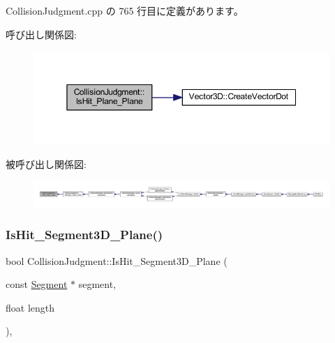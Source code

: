  Collision\+Judgment.\+cpp の 765 行目に定義があります。

呼び出し関係図\+:\nopagebreak
\begin{figure}[H]
\begin{center}
\leavevmode
\includegraphics[width=350pt]{class_collision_judgment_a549042895226422e8551afff35519a59_cgraph}
\end{center}
\end{figure}
被呼び出し関係図\+:
\nopagebreak
\begin{figure}[H]
\begin{center}
\leavevmode
\includegraphics[width=350pt]{class_collision_judgment_a549042895226422e8551afff35519a59_icgraph}
\end{center}
\end{figure}
\mbox{\label{class_collision_judgment_a0f5514dbfaa4dde5531cb6e5512502e5}} 
\subsubsection{\texorpdfstring{Is\+Hit\+\_\+\+Segment3\+D\+\_\+\+Plane()}{IsHit\_Segment3D\_Plane()}}
{\footnotesize\ttfamily bool Collision\+Judgment\+::\+Is\+Hit\+\_\+\+Segment3\+D\+\_\+\+Plane (\begin{DoxyParamCaption}\item[{const \mbox{\hyperlink{class_segment}{Segment}} $\ast$}]{segment,  }\item[{float}]{length }\end{DoxyParamCaption})\hspace{0.3cm}{\ttfamily [static]}, {\ttfamily [private]}}



